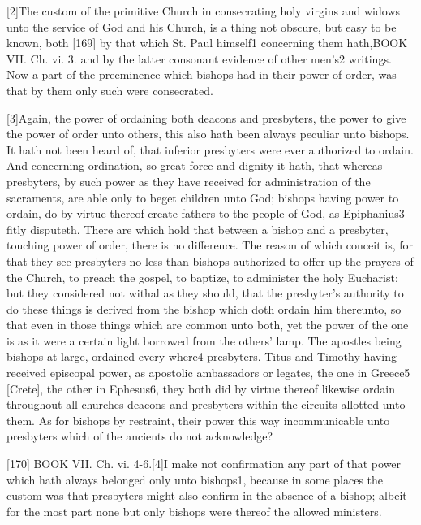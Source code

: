 [2]The custom of the primitive Church in consecrating holy virgins and widows unto the service of God and his Church, is a thing not obscure, but easy to be known, both [169] by that which St. Paul himself1 concerning them hath,BOOK VII. Ch. vi. 3. and by the latter consonant evidence of other men’s2 writings. Now a part of the preeminence which bishops had in their power of order, was that by them only such were consecrated.

[3]Again, the power of ordaining both deacons and presbyters, the power to give the power of order unto others, this also hath been always peculiar unto bishops. It hath not been heard of, that inferior presbyters were ever authorized to ordain. And concerning ordination, so great force and dignity it hath, that whereas presbyters, by such power as they have received for administration of the sacraments, are able only to beget children unto God; bishops having power to ordain, do by virtue thereof create fathers to the people of God, as Epiphanius3 fitly disputeth. There are which hold that between a bishop and a presbyter, touching power of order, there is no difference. The reason of which conceit is, for that they see presbyters no less than bishops authorized to offer up the prayers of the Church, to preach the gospel, to baptize, to administer the holy Eucharist; but they considered not withal as they should, that the presbyter’s authority to do these things is derived from the bishop which doth ordain him thereunto, so that even in those things which are common unto both, yet the power of the one is as it were a certain light borrowed from the others’ lamp. The apostles being bishops at large, ordained every where4 presbyters. Titus and Timothy having received episcopal power, as apostolic ambassadors or legates, the one in Greece5 [Crete], the other in Ephesus6, they both did by virtue thereof likewise ordain throughout all churches deacons and presbyters within the circuits allotted unto them. As for bishops by restraint, their power this way incommunicable unto presbyters which of the ancients do not acknowledge?

[170]
BOOK VII. Ch. vi. 4-6.[4]I make not confirmation any part of that power which hath always belonged only unto bishops1, because in some places the custom was that presbyters might also confirm in the absence of a bishop; albeit for the most part none but only bishops were thereof the allowed ministers.

